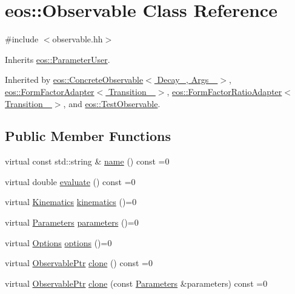 \hypertarget{classeos_1_1Observable}{
\section{eos::Observable Class Reference}
\label{classeos_1_1Observable}
}


{\ttfamily \#include $<$observable.hh$>$}

Inherits \hyperlink{classeos_1_1ParameterUser}{eos::ParameterUser}.

Inherited by \hyperlink{classeos_1_1ConcreteObservable}{eos::ConcreteObservable$<$ Decay\_\-, Args\_\- $>$}, \hyperlink{classeos_1_1FormFactorAdapter}{eos::FormFactorAdapter$<$ Transition\_\- $>$}, \hyperlink{classeos_1_1FormFactorRatioAdapter}{eos::FormFactorRatioAdapter$<$ Transition\_\- $>$}, and \hyperlink{structeos_1_1TestObservable}{eos::TestObservable}.\subsection*{Public Member Functions}
\begin{DoxyCompactItemize}
\item 
virtual const std::string \& \hyperlink{classeos_1_1Observable_adfdc8fe469e00adeb464d3b3e4e14236}{name} () const =0
\item 
virtual double \hyperlink{classeos_1_1Observable_a913385d3a077d578bbcc2d502e5fdc2d}{evaluate} () const =0
\item 
virtual \hyperlink{classeos_1_1Kinematics}{Kinematics} \hyperlink{classeos_1_1Observable_a8bfd8cc2873e467ac9ae100d029d8c49}{kinematics} ()=0
\item 
virtual \hyperlink{classeos_1_1Parameters}{Parameters} \hyperlink{classeos_1_1Observable_a233852d22f287944b8bbf4da803289b1}{parameters} ()=0
\item 
virtual \hyperlink{classeos_1_1Options}{Options} \hyperlink{classeos_1_1Observable_a237cf968a4f46a93e0cc8ba0fdbaceee}{options} ()=0
\item 
virtual \hyperlink{namespaceeos_a470e5dd806bd129080f1aa0c2954646f}{ObservablePtr} \hyperlink{classeos_1_1Observable_a1c88c66a224a14fbddad70e95cb61136}{clone} () const =0
\item 
virtual \hyperlink{namespaceeos_a470e5dd806bd129080f1aa0c2954646f}{ObservablePtr} \hyperlink{classeos_1_1Observable_a20e8218d04aa5589ce795ddd425751a0}{clone} (const \hyperlink{classeos_1_1Parameters}{Parameters} \&parameters) const =0
\end{DoxyCompactItemize}

